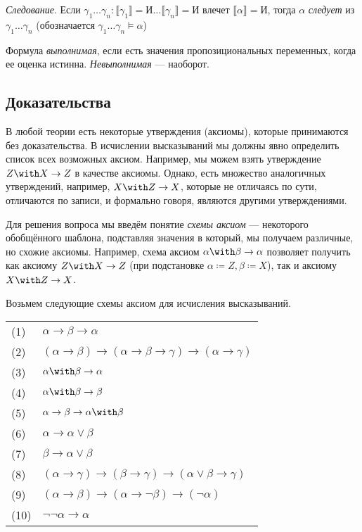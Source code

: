 \begin{definition} \emph{Следование}.
Если $\gamma_1 \dots \gamma_n : \llbracket \gamma_1 \rrbracket = \texttt{И} \dots
\llbracket \gamma_n \rrbracket = \texttt{И}$ влечет $\llbracket \alpha
\rrbracket = \texttt{И}$,  тогда $\alpha$ \emph{следует} из $\gamma_1 \dots
\gamma_n$ (обозначается $\gamma_1 \dots \gamma_n \models \alpha$) 
\end{definition}

\begin{definition} Формула \emph{выполнимая}, если есть значения
  пропозициональных переменных, когда ее оценка истинна. \emph{Невыполнимая}
  --- наоборот.
\end{definition}


\subsection{Доказательства}

В любой теории есть некоторые утверждения (аксиомы), которые принимаются без доказательства.
В исчислении высказываний мы должны явно определить список всех возможных аксиом. 
Например, мы можем взять утверждение $Z \with X \rightarrow Z$ в качестве аксиомы.
Однако, есть множество аналогичных утверждений, например, $X \with Z \rightarrow X$,
которые не отличаясь по сути, отличаются по записи, и формально говоря, являются другими
утверждениями.

Для решения вопроса мы введём понятие \emph{схемы аксиом} --- некоторого обобщённого
шаблона, подставляя значения в который, мы получаем различные, но схожие аксиомы. 
Например, схема аксиом $\alpha \with \beta \rightarrow \alpha$ позволяет получить как
аксиому $Z \with X \rightarrow Z$ (при подстановке $\alpha \coloneqq  Z, \beta
\coloneqq  X$), так и аксиому $X \with Z \rightarrow X$.

Возьмем следующие схемы аксиом для исчисления высказываний.

\begin{tabular}{ll}
(1) & $\alpha \rightarrow \beta \rightarrow \alpha$ \\
(2) & $(\alpha \rightarrow \beta) \rightarrow (\alpha \rightarrow \beta \rightarrow \gamma) \rightarrow (\alpha \rightarrow \gamma)$ \\
(3) & $\alpha \with \beta \rightarrow \alpha$\\
(4) & $\alpha \with \beta \rightarrow \beta$\\
(5) & $\alpha \rightarrow \beta \rightarrow \alpha \with \beta$\\
(6) & $\alpha \rightarrow \alpha \vee \beta$\\
(7) & $\beta \rightarrow \alpha \vee \beta$\\
(8) & $(\alpha \rightarrow \gamma) \rightarrow (\beta \rightarrow \gamma) \rightarrow (\alpha \vee \beta \rightarrow \gamma)$\\
(9) & $(\alpha \rightarrow \beta) \rightarrow (\alpha \rightarrow \neg \beta) \rightarrow (\neg \alpha)$\\
(10) & $\neg \neg \alpha \rightarrow \alpha$
\end{tabular}

